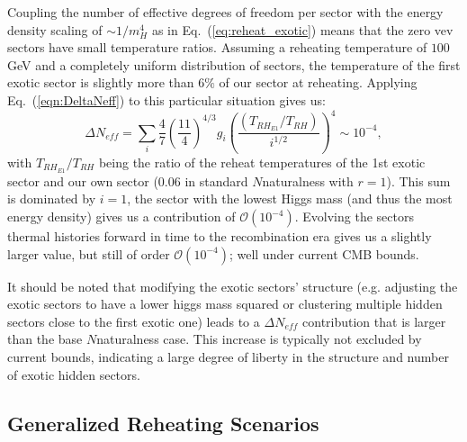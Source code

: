 \documentclass[nofootinbib,twocolumn,preprintnumbers]{revtex4-1}
\begin{document}

Coupling the number of effective degrees of freedom per sector with the energy density scaling of $\sim 1/m_H^4$ as in Eq.~(\ref{eq:reheat_exotic}) means that the zero vev sectors have small temperature ratios. Assuming a reheating temperature of $100$ GeV and a completely uniform distribution of sectors, the temperature of the first exotic sector is slightly more than $6\%$ of our sector at reheating. Applying Eq.~(\ref{eqn:DeltaNeff}) to this particular situation gives us:
\begin{equation}
\Delta N_{eff} = \sum_i \frac{4}{7}\left(\frac{11}{4}\right)^{4/3}g_{i} \left(\frac{(T_{RH_{E1}}/T_{RH})}{i^{1/2}}\right)^4 \sim 10^{-4},
\end{equation}     
with $T_{RH_{E1}}/T_{RH}$ being the ratio of the reheat temperatures of the 1st exotic sector and our own sector ($0.06$ in standard $N$naturalness with $r = 1$).  This sum is dominated by $i=1$, the sector with the lowest Higgs mass (and thus the most energy density) gives us a contribution of $\mathcal{O} (10^{-4})$. Evolving the sectors thermal histories forward in time to the recombination era gives us a slightly larger value, but still of order $\mathcal{O}(10^{-4})$; well under current CMB bounds. 

It should be noted that modifying the exotic sectors' structure (e.g. adjusting the exotic sectors to have a lower higgs mass squared or clustering multiple hidden sectors close to the first exotic one) leads to a $\Delta N_{eff}$ contribution that is larger than the base $N$naturalness case. This increase is typically not excluded by current bounds, indicating a large degree of liberty in the structure and number of exotic hidden sectors.


\subsection{Generalized Reheating Scenarios}
\end{document}
